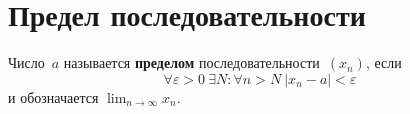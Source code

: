 \section{Предел последовательности}
\hypertarget{def:limit_of_sequence}{} Число~$a$ называется \textbf{пределом} последовательности~$(x_n)$, если
\begin{equation*}
\forall \varepsilon > 0 \ \exists N \colon \forall n > N \ |x_n - a| < \varepsilon
\end{equation*}
и обозначается $\displaystyle \lim_{n \to \infty} x_n$.
